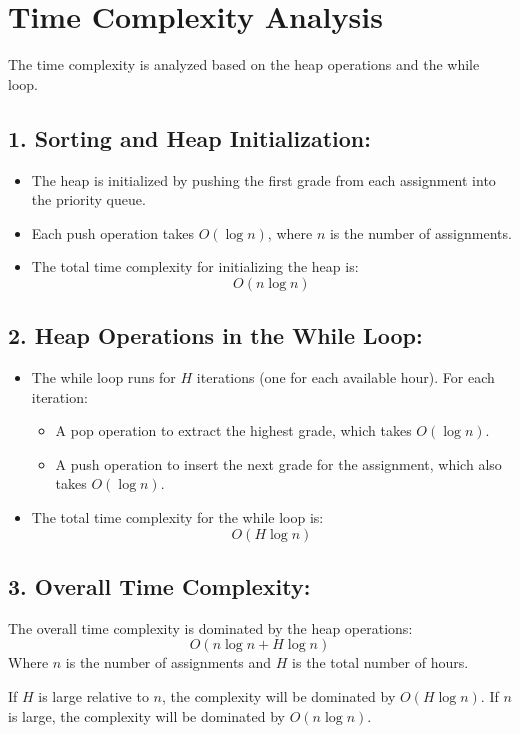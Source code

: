 \documentclass[a4paper,12pt]{report}
\begin{document}
\section*{Time Complexity Analysis}

The time complexity is analyzed based on the heap operations and the while loop.

\subsection*{1. Sorting and Heap Initialization:}
\begin{itemize}
	\item The heap is initialized by pushing the first grade from each assignment into the priority queue.
	\item Each push operation takes \( O(\log n) \), where \( n \) is the number of assignments.
	\item The total time complexity for initializing the heap is:
	\[
	O(n \log n)
	\]
\end{itemize}

\subsection*{2. Heap Operations in the While Loop:}
\begin{itemize}
	\item The while loop runs for \( H \) iterations (one for each available hour). For each iteration:
	\begin{itemize}
		\item A pop operation to extract the highest grade, which takes \( O(\log n) \).
		\item A push operation to insert the next grade for the assignment, which also takes \( O(\log n) \).
	\end{itemize}
	\item The total time complexity for the while loop is:
	\[
	O(H \log n)
	\]
\end{itemize}

\subsection*{3. Overall Time Complexity:}
The overall time complexity is dominated by the heap operations:
\[
O(n \log n + H \log n)
\]
Where \( n \) is the number of assignments and \( H \) is the total number of hours.

If \( H \) is large relative to \( n \), the complexity will be dominated by \( O(H \log n) \). If \( n \) is large, the complexity will be dominated by \( O(n \log n) \).
\end{document}
